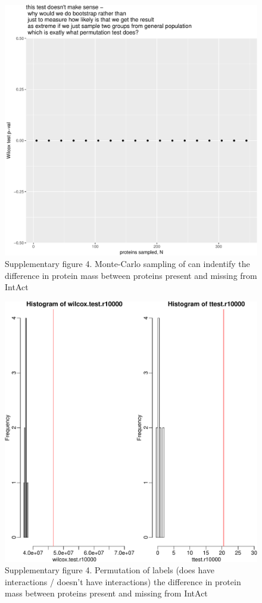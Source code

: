 \documentclass[]{article}
\begin{document}
\begin{figure}[htbp]
\centering
\includegraphics{final_report_files/figure-latex/Supplementary4_protein_mass_distribution_monte_carlo-1.pdf}
\caption{Supplementary figure 4. Monte-Carlo sampling of can indentify
the difference in protein mass between proteins present and missing from
IntAct}
\end{figure}

\begin{figure}[htbp]
\centering
\includegraphics{final_report_files/figure-latex/Supplementary4_protein_mass_distribution_permutations-1.pdf}
\caption{Supplementary figure 4. Permutation of labels (does have
interactions / doesn't have interactions) the difference in protein mass
between proteins present and missing from IntAct}
\end{figure}
\end{document}
